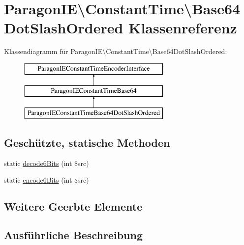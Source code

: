 \hypertarget{class_paragon_i_e_1_1_constant_time_1_1_base64_dot_slash_ordered}{}\section{Paragon\+IE\textbackslash{}Constant\+Time\textbackslash{}Base64\+Dot\+Slash\+Ordered Klassenreferenz}
\label{class_paragon_i_e_1_1_constant_time_1_1_base64_dot_slash_ordered}
Klassendiagramm für Paragon\+IE\textbackslash{}Constant\+Time\textbackslash{}Base64\+Dot\+Slash\+Ordered\+:\begin{figure}[H]
\begin{center}
\leavevmode
\includegraphics[height=3.000000cm]{class_paragon_i_e_1_1_constant_time_1_1_base64_dot_slash_ordered}
\end{center}
\end{figure}
\subsection*{Geschützte, statische Methoden}
\begin{DoxyCompactItemize}
\item 
static \mbox{\hyperlink{class_paragon_i_e_1_1_constant_time_1_1_base64_dot_slash_ordered_a518679a43dd3377188ad2fa1e32957d7}{decode6\+Bits}} (int \$src)
\item 
static \mbox{\hyperlink{class_paragon_i_e_1_1_constant_time_1_1_base64_dot_slash_ordered_a84602c1006fadd51023a7195a6acb00d}{encode6\+Bits}} (int \$src)
\end{DoxyCompactItemize}
\subsection*{Weitere Geerbte Elemente}


\subsection{Ausführliche Beschreibung}


